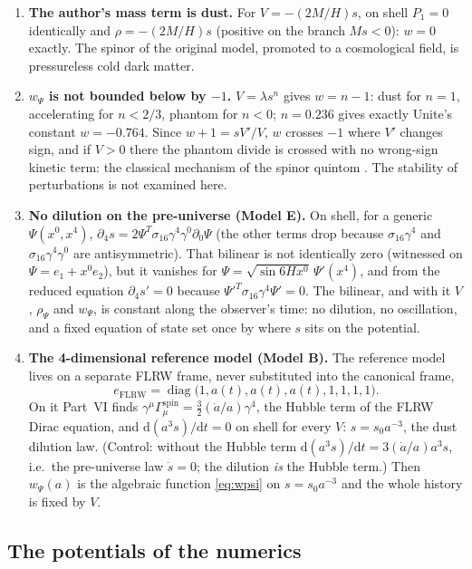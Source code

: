 \documentclass[11pt,a4paper]{article}
\newcommand{\sig}{\sigma_{16}}
\newcommand{\dd}{\mathrm{d}}
\newcommand{\diag}{\operatorname{diag}}
\begin{document}
\begin{enumerate}[label=(F\arabic*)]
\item \textbf{The author's mass term is dust.} For $V=-(2M/H)s$, on shell $P_1=0$ identically
  and $\rho=-(2M/H)s$ (positive on the branch $Ms<0$): $w=0$ exactly. The spinor of the original
  model, promoted to a cosmological field, is pressureless cold dark matter.
\item \textbf{$w_\Psi$ is not bounded below by $-1$.} $V=\lambda s^n$ gives $w=n-1$: dust for
  $n=1$, accelerating for $n<2/3$, phantom for $n<0$; $n=0.236$ gives exactly Unite's constant
  $w=-0.764$. Since $w+1=sV'/V$, $w$ crosses $-1$ where $V'$ changes sign, and if $V>0$ there the
  phantom divide is crossed with no wrong-sign kinetic term: the classical mechanism of the spinor
  quintom \cite{Cai2008,Feng2005}. The stability of perturbations is not examined here.
\item \textbf{No dilution on the pre-universe (Model E).} On shell, for a generic
  $\Psi(x^0,x^4)$, $\partial_4 s=2\Psi^{T}\sig\gamma^4\gamma^0\partial_0\Psi$ (the other terms drop
  because $\sig\gamma^4$ and $\sig\gamma^4\gamma^0$ are antisymmetric). That bilinear is not
  identically zero (witnessed on $\Psi=e_1+x^0e_2$), but it vanishes for
  $\Psi=\sqrt{\sin 6Hx^0}\,\Psi'(x^4)$, and from the reduced equation $\partial_4s'=0$ because
  $\Psi'^{T}\sig\gamma^4\Psi'=0$. The bilinear, and with it $V$, $\rho_\Psi$ and $w_\Psi$, is constant
  along the observer's time: no dilution, no oscillation, and a fixed equation of state set once
  by where $s$ sits on the potential.
\item \textbf{The 4-dimensional reference model (Model B).} The reference model lives on a
  separate FLRW frame, never substituted into the canonical frame,
  \begin{equation*}
    e_{\mathrm{FLRW}}=\diag\bigl(1,a(t),a(t),a(t),1,1,1,1\bigr).
  \end{equation*}
  On it Part~VI finds $\gamma^\mu\Gamma^{\mathrm{spin}}_\mu=\tfrac32(\dot a/a)\gamma^4$, the Hubble term of the FLRW
  Dirac equation, and $\dd(a^3s)/\dd t=0$ on shell for every $V$: $s=s_0a^{-3}$, the dust dilution
  law. (Control: without the Hubble term $\dd(a^3s)/\dd t=3(\dot a/a)a^3s$, i.e.\ the pre-universe
  law $\dot s=0$; the dilution \emph{is} the Hubble term.) Then $w_\Psi(a)$ is the algebraic
  function \eqref{eq:wpsi} on $s=s_0a^{-3}$ and the whole history is fixed by $V$.
\end{enumerate}

\subsection{The potentials of the numerics}
\end{document}
